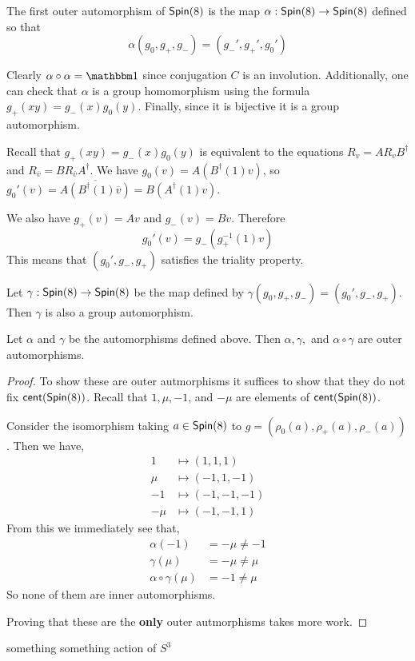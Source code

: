 \begin{defn}
The first outer automorphism of $\operatorname{\textsf{Spin}}(8)$ is the map $\alpha : \operatorname{\textsf{Spin}}(8)\to \operatorname{\textsf{Spin}}(8)$ defined so that
\[\alpha(g_0,g_+,g_-)=(g_-',g_+',g_0')\]
\end{defn}
\begin{remark*}
    Clearly $\alpha\circ\alpha = \One$ since conjugation $C$ is an involution. Additionally, one can check that $\alpha$ is a group homomorphism using the formula $g_+(xy)=g_-(x)g_0(y)$. Finally, since it is bijective it is a group automorphism.
\end{remark*}
\begin{remark*}
    Recall that $g_+(xy)=g_-(x)g_0(y)$ is equivalent to the equations $R_v = A R_v B^\dagger$ and $R_{\overline{v}} = BR_{\overline{v}}A^\dagger$. We have $g_0(v) = A(B^\dagger(1)v)$, so $g_0'(v) = \overline{A(B^\dagger(1)\overline{v})} = B(A^\dagger(1)v)$. 

    We also have $g_+(v) = Av$ and $g_-(v) = Bv$. Therefore
    \[g_0'(v) = g_-(g_+^{-1}(1)v)\]
    This means that $(g_0', g_-,g_+)$ satisfies the triality property.
\end{remark*}
\begin{defn}
Let $\gamma : \operatorname{\textsf{Spin}}(8)\to \operatorname{\textsf{Spin}}(8)$ be the map defined by $\gamma(g_0,g_+,g_-) = (g_0',g_-,g_+)$. Then $\gamma$ is also a group automorphism.
\end{defn}
\begin{thm}
Let $\alpha$ and $\gamma$ be the automorphisms defined above. Then $\alpha, \gamma,$ and $\alpha\circ\gamma$ are outer automorphisms.
\end{thm}
\begin{proof}
To show these are outer autmorphisms it suffices to show that they do not fix $\operatorname{\textsf{cent}}(\operatorname{\textsf{Spin}}(8))$. Recall that $1,\mu,-1$, and $-\mu$ are elements of $\operatorname{\textsf{cent}}(\operatorname{\textsf{Spin}}(8))$.

Consider the isomorphism taking $a \in \operatorname{\textsf{Spin}}(8)$ to $g=(\rho_0(a),\rho_+(a),\rho_-(a))$. Then we have,
\begin{align*}
    1&\mapsto (1,1,1)\\
    \mu&\mapsto (-1,1,-1)\\
    -1&\mapsto (-1,-1,-1)\\
    -\mu&\mapsto (-1,-1,1)
\end{align*}
From this we immediately see that,
\begin{align*}
    \alpha(-1)&=-\mu \neq -1\\
    \gamma(\mu)&=-\mu \neq \mu\\
    \alpha\circ\gamma(\mu)&=-1\neq \mu
\end{align*}
So none of them are inner automorphisms.

Proving that these are the \textbf{only} outer autmorphisms takes more work.
\end{proof}

\begin{remark*}
    something something action of $S^3$ 
\end{remark*}
